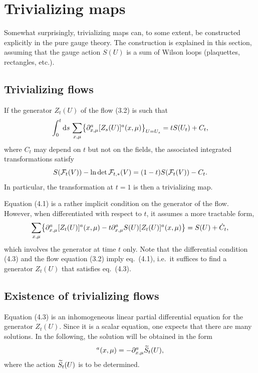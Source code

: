 \section{Trivializing maps}

Somewhat surprisingly, trivializing maps can, to some extent,
be constructed expli\-cit\-ly in the pure gauge theory.
The construction is explained in this section, assuming
that the gauge action $S(U)$ is
a sum of Wilson loops (plaquettes, rectangles, etc.).


\subsection{Trivializing flows}

If the generator $Z_t(U)$ of the flow (3.2) is such that
\begin{equation}
  \int_0^t\mathrm{d} s\,\sum_{x,\mu}
  \bigl\{\partial^a_{x,\mu}[Z_s(U)]^a(x,\mu)\bigr\}_{U=U_s}
  =tS(U_t)+C_t,
\end{equation}
where $C_t$ may depend on $t$ but not on the fields,
the associated integrated transformations satisfy
\begin{equation}
  S(\mathcal{F}_{t}(V))-\ln\det\mathcal{F}_{t,*}(V)=(1-t)S(\mathcal{F}_{t}(V))-C_t.
\end{equation}
In particular, the transformation at $t=1$
is then a trivializing map.

Equation (4.1) is a rather implicit condition on the generator of
the flow. However, when differentiated with respect to
$t$, it assumes a more tractable form,
\begin{equation}
  \sum_{x,\mu}\bigl\{
  \partial^a_{x,\mu}[Z_t(U)]^a(x,\mu)
  -t\partial^a_{x,\mu}S(U)[Z_t(U)]^a(x,\mu)\bigr\}=
  S(U)+\dot{C}_t,
\end{equation}
which involves the generator at time $t$ only.
Note that the differential condition (4.3)
and the flow equation (3.2) imply eq.~(4.1),
i.e.\ it suffices to find a generator $Z_t(U)$ that satisfies
eq.~(4.3).


\subsection{Existence of trivializing flows}

Equation (4.3) is an inhomogeneous linear partial differential
equation for the generator $Z_t(U)$.
Since it is a scalar equation,
one expects that there are many solutions.
In the following, the solution will be obtained in the form
\begin{equation}
  [Z_t(U)]^a(x,\mu)=-\du^a_{x,\mu}\Sflow_t(U),
\end{equation}
where the action $\widetilde{S}_t(U)$ is to be determined.

